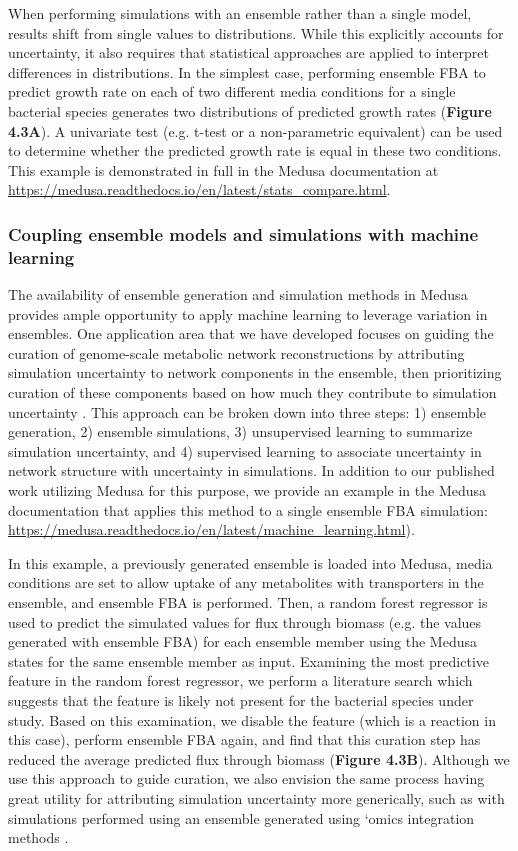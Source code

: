 \documentclass[11pt,twocolumn,notitlepage,openany,twoside]{book}
\begin{document}
\begin{refsection}
When performing simulations with an ensemble rather than a single model, results shift from single values to distributions. While this explicitly accounts for uncertainty, it also requires that statistical approaches are applied to interpret differences in distributions. In the simplest case, performing ensemble FBA to predict growth rate on each of two different media conditions for a single bacterial species generates two distributions of predicted growth rates (\textbf{Figure 4.3A}). A univariate test (e.g. t-test or a non-parametric equivalent) can be used to determine whether the predicted growth rate is equal in these two conditions. This example is demonstrated in full in the Medusa documentation at \url{https://medusa.readthedocs.io/en/latest/stats_compare.html}.

\subsubsection{Coupling ensemble models and simulations with machine learning}

The availability of ensemble generation and simulation methods in Medusa provides ample opportunity to apply machine learning to leverage variation in ensembles. One application area that we have developed focuses on guiding the curation of genome-scale metabolic network reconstructions by attributing simulation uncertainty to network components in the ensemble, then prioritizing curation of these components based on how much they contribute to simulation uncertainty \cite{Medlock2018-kx}. This approach can be broken down into three steps: 1) ensemble generation, 2) ensemble simulations, 3) unsupervised learning to summarize simulation uncertainty, and 4) supervised learning to associate uncertainty in network structure with uncertainty in simulations. In addition to our published work utilizing Medusa for this purpose, we provide an example in the Medusa documentation that applies this method to a single ensemble FBA simulation: \url{https://medusa.readthedocs.io/en/latest/machine_learning.html}).

In this example, a previously generated ensemble is loaded into Medusa, media conditions are set to allow uptake of any metabolites with transporters in the ensemble, and ensemble FBA is performed. Then, a random forest regressor is used to predict the simulated values for flux through biomass (e.g. the values generated with ensemble FBA) for each ensemble member using the Medusa states for the same ensemble member as input. Examining the most predictive feature in the random forest regressor, we perform a literature search which suggests that the feature is likely not present for the bacterial species under study. Based on this examination, we disable the feature (which is a reaction in this case), perform ensemble FBA again, and find that this curation step has reduced the average predicted flux through biomass (\textbf{Figure 4.3B}). Although we use this approach to guide curation, we also envision the same process having great utility for attributing simulation uncertainty more generically, such as with simulations performed using an ensemble generated using ‘omics integration methods \cite{Blazier2012-oo}.


\end{refsection}
\end{document}
